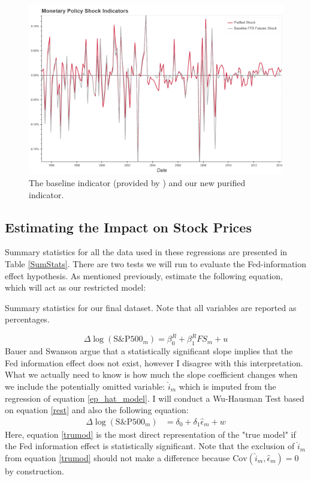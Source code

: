 \documentclass[a4paper,man,floatsintext,natbib]{apa6}
\begin{document}
	\begin{figure}
		\centering
		\includegraphics[width=\textwidth]{charts/new_indicator.png}
		\caption{\label{new_ind} The baseline indicator (provided by \citeauthor{Nakamura2018}) and our new purified indicator.}
	\end{figure}
	\newpage
	\subsection{Estimating the Impact on Stock Prices}
	Summary statistics for all the data used in these regressions are presented in Table \ref{SumStats}. There are two tests we will run to evaluate the Fed-information effect hypothesis. As mentioned previously, \cite{Bauer2020} estimate the following equation, which will act as our restricted model:
	\begin{table}[H]
		\centering
		
		\caption{Summary statistics for our final dataset. Note that all variables are reported as percentages.}
		\label{SumStats}
	\end{table}
	
	\[
	\Delta \log{(\text{S\&P500}_m)} = \beta^R_0 + \beta^R_1 FS_m + u \tag{6} \label{rest}
	\]
	Bauer and Swanson argue that a statistically significant slope implies that the Fed information effect does not exist, however I disagree with this interpretation. What we actually need to know is how much the slope coefficient changes when we include the potentially omitted variable: \(\hat{i}_m\) which is imputed from the regression of equation \ref{ep_hat_model}. I will conduct a Wu-Hausman Test based on equation \ref{rest} and also the following equation:
	\begin{align*}
		\Delta \log{(\text{S\&P500}_m)} &= \delta_0 + \delta_1 \hat{\epsilon}_m + w \tag{8} \label{trumod}
	\end{align*}
	Here, equation \ref{trumod} is the most direct representation of the "true model" if the Fed information effect is statistically significant. Note that the exclusion of \(\hat{i}_m\) from equation \ref{trumod} should not make a difference because \(\mathrm{Cov}(\hat{i}_m, \hat{\epsilon}_m) = 0\) by construction.
	
\end{document}
